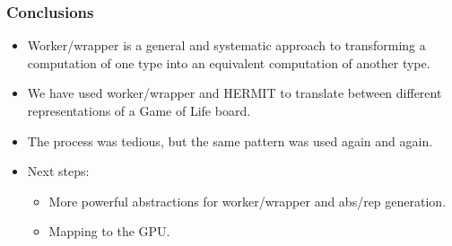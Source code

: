 \documentclass[smaller]{beamer}
\begin{document}
\begin{frame}
\frametitle{Conclusions}

\begin{itemize}
\item Worker/wrapper is a general and systematic approach to transforming
a computation of one type into an equivalent computation of another type.

\item We have used worker/wrapper and HERMIT to translate
between different representations of a Game of Life board.

\item The process was tedious, but the same pattern was used again and again.

\item Next steps:
\begin{itemize}
\item More powerful abstractions for worker/wrapper and abs/rep generation.
\item Mapping to the GPU.
\end{itemize}

\end{itemize}

\end{frame}

%
%
\end{document}
